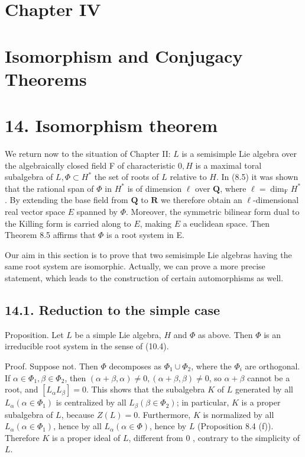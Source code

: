 \documentclass[10pt]{article}
\begin{document}
\section*{Chapter IV}
\section*{Isomorphism and Conjugacy Theorems}
\section*{14. Isomorphism theorem}
We return now to the situation of Chapter II: $L$ is a semisimple Lie algebra over the algebraically closed field F of characteristic $0, H$ is a maximal toral subalgebra of $L, \Phi \subset H^{*}$ the set of roots of $L$ relative to $H$. In (8.5) it was shown that the rational span of $\Phi$ in $H^{*}$ is of dimension $\ell$ over $\mathbf{Q}$, where $\ell=\operatorname{dim}_{\mathrm{F}} H^{*}$. By extending the base field from $\mathbf{Q}$ to $\mathbf{R}$ we therefore obtain an $\ell$-dimensional real vector space $E$ spanned by $\Phi$. Moreover, the symmetric bilinear form dual to the Killing form is carried along to $E$, making $E$ a euclidean space. Then Theorem 8.5 affirms that $\Phi$ is a root system in E.

Our aim in this section is to prove that two semisimple Lie algebras having the same root system are isomorphic. Actually, we can prove a more precise statement, which leads to the construction of certain automorphisms as well.

\subsection*{14.1. Reduction to the simple case}
Proposition. Let $L$ be a simple Lie algebra, $H$ and $\Phi$ as above. Then $\Phi$ is an irreducible root system in the sense of (10.4).

Proof. Suppose not. Then $\Phi$ decomposes as $\Phi_{1} \cup \Phi_{2}$, where the $\Phi_{i}$ are orthogonal. If $\alpha \in \Phi_{1}, \beta \in \Phi_{2}$, then $(\alpha+\beta, \alpha) \neq 0,(\alpha+\beta, \beta) \neq 0$, so $\alpha+\beta$ cannot be a root, and $\left[L_{\alpha} L_{\beta}\right]=0$. This shows that the subalgebra $K$ of $L$ generated by all $L_{\alpha}\left(\alpha \in \Phi_{1}\right)$ is centralized by all $L_{\beta}\left(\beta \in \Phi_{2}\right)$; in particular, $K$ is a proper subalgebra of $L$, because $Z(L)=0$. Furthermore, $K$ is normalized by all $L_{\alpha}\left(\alpha \in \Phi_{1}\right)$, hence by all $L_{\alpha}(\alpha \in \Phi)$, hence by $L$ (Proposition 8.4 (f)). Therefore $K$ is a proper ideal of $L$, different from 0 , contrary to the simplicity of $L$.
\end{document}
